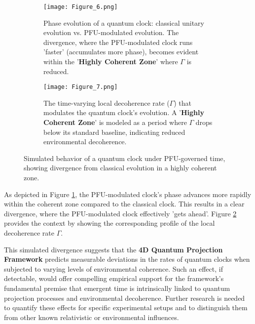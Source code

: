 \documentclass[12pt,a4paper]{article}
\numberwithin{equation}{section}
\begin{document}
\begin{figure}[H]
    \centering
    \begin{subfigure}[b]{0.8\textwidth}
        \centering
        \texttt{[image: Figure\_6.png]} %
        \caption{Phase evolution of a quantum clock: classical unitary evolution vs. PFU-modulated evolution. The divergence, where the PFU-modulated clock runs 'faster' (accumulates more phase), becomes evident within the '\textbf{Highly Coherent Zone}' where $\Gamma$ is reduced.}
        \label{fig:quantum_clock_phase_divergence}
    \end{subfigure}
    \vspace{1em}
    \begin{subfigure}[b]{0.8\textwidth}
        \centering
        \texttt{[image: Figure\_7.png]} %
        \caption{The time-varying local decoherence rate ($\Gamma$) that modulates the quantum clock's evolution. A '\textbf{Highly Coherent Zone}' is modeled as a period where $\Gamma$ drops below its standard baseline, indicating reduced environmental decoherence.}
        \label{fig:gamma_modulation_profile}
    \end{subfigure}
    \caption{Simulated behavior of a quantum clock under PFU-governed time, showing divergence from classical evolution in a highly coherent zone.}
    \label{fig:quantum_clock_simulation}
\end{figure}

As depicted in Figure \ref{fig:quantum_clock_phase_divergence}, the PFU-modulated clock's phase advances more rapidly within the coherent zone compared to the classical clock. This results in a clear divergence, where the PFU-modulated clock effectively 'gets ahead'. Figure \ref{fig:gamma_modulation_profile} provides the context by showing the corresponding profile of the local decoherence rate $\Gamma$.

This simulated divergence suggests that the \textbf{4D Quantum Projection Framework} predicts measurable deviations in the rates of quantum clocks when subjected to varying levels of environmental coherence. Such an effect, if detectable, would offer compelling empirical support for the framework's fundamental premise that emergent time is intrinsically linked to quantum projection processes and environmental decoherence. Further research is needed to quantify these effects for specific experimental setups and to distinguish them from other known relativistic or environmental influences.
\end{document}
